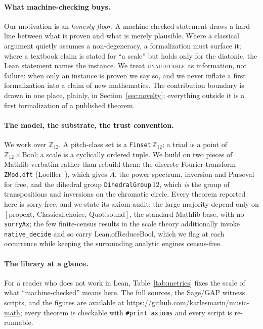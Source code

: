\documentclass[11pt]{article}
\newcommand{\lean}[1]{\texttt{#1}}
\newcommand{\Ztwelve}{\mathbb{Z}_{12}}
\newcommand{\Ahat}{\hat{A}}
\begin{document}
\paragraph{What machine-checking buys.} Our motivation is an \emph{honesty floor}. A
machine-checked statement draws a hard line between what is proven and what is merely plausible.
Where a classical argument quietly assumes a non-degeneracy, a formalization must surface it;
where a textbook claim is stated for ``a scale'' but holds only for the diatonic, the Lean
statement names the instance. We treat \textsc{unauditable} as information, not failure: when
only an instance is proven we say so, and we never inflate a first formalization into a claim of
new mathematics. The contribution boundary is drawn in one place, plainly, in
Section~\ref{sec:novelty}; everything outside it is a first formalization of a published theorem.

\paragraph{The model, the substrate, the trust convention.} We work over $\Ztwelve$. A
pitch-class set is a \lean{Finset}\,$\Ztwelve$; a triad is a point of
$\Ztwelve\times\mathrm{Bool}$; a scale is a cyclically ordered tuple. We build on two pieces of
Mathlib verbatim rather than rebuild them: the discrete Fourier transform \lean{ZMod.dft}
(Loeffler~\cite{Loeffler}), which gives $\Ahat$, the power spectrum, inversion and Parseval for
free, and the dihedral group \lean{DihedralGroup}\,$12$, which \emph{is} the group of
transpositions and inversions on the chromatic circle. Every theorem reported here is
sorry-free, and we state its axiom audit: the large majority depend only on
$[\mathrm{propext},\,\mathrm{Classical.choice},\,\mathrm{Quot.sound}]$, the standard Mathlib
base, with no \lean{sorryAx}; the few finite-census results in the scale theory additionally
invoke \lean{native\_decide} and so carry $\mathrm{Lean.ofReduceBool}$, which we flag at each
occurrence while keeping the surrounding analytic engines census-free.

\paragraph{The library at a glance.} For a reader who does not work in Lean, Table~\ref{tab:metrics}
fixes the scale of what ``machine-checked'' means here. The full sources, the Sage/GAP witness
scripts, and the figures are available at \url{https://github.com/karlesmarin/music-math}; every
theorem is checkable with \lean{\#print axioms} and every script is re-runnable.
\end{document}

